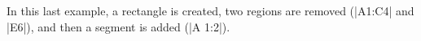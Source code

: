 \begin{codeexample}[width=6cm]
	\begin{goban}[label = {at = all}, partial = A1:E6]
	\end{goban}

	\begin{goban}[label = {at = all}, partial = A1:E6]
	\end{goban}

	\begin{goban}[label = {at = all}, partial = A1:E6]
	\end{goban}
\end{codeexample}

In this last example, a rectangle is created, two regions are removed (|A1:C4| and |E6|), and then a segment is added (|A 1:2|).
